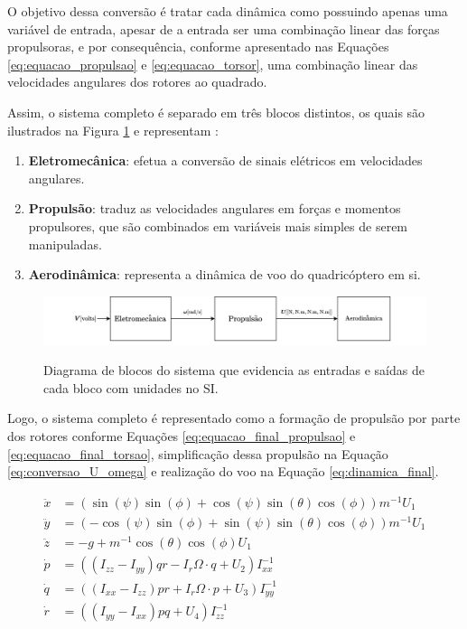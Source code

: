 \documentclass[main.tex]{subfiles}
\begin{document}
O objetivo dessa conversão é tratar cada dinâmica como possuindo apenas uma variável de entrada, apesar de a entrada ser uma combinação linear das forças propulsoras, e por consequência, conforme apresentado nas Equações \ref{eq:equacao_propulsao} e \ref{eq:equacao_torsor}, uma combinação linear das velocidades angulares dos rotores ao quadrado.


Assim, o sistema completo é separado em três blocos distintos, os quais são ilustrados na Figura \ref{fig:diagrama_blocos_final} e representam :
\begin{enumerate}
	\item \textbf{Eletromecânica}: efetua a conversão de sinais elétricos em velocidades angulares.
	\item \textbf{Propulsão}: traduz as velocidades angulares em forças e momentos propulsores, que são combinados em variáveis mais simples de serem manipuladas.
	\item \textbf{Aerodinâmica}: representa a dinâmica de voo do quadricóptero em si.
\end{enumerate} 

\begin{figure}[!h]
	\centering
	\caption{Diagrama de blocos do sistema que evidencia as entradas e saídas de cada bloco com unidades no SI.}
	\includegraphics[width=1\textwidth]{capitulos/modelagem/imgs/diagrama_blocos_final.png}
	\label{fig:diagrama_blocos_final}
\end{figure}


Logo, o sistema completo é representado como a formação de propulsão por parte dos rotores conforme Equações \ref{eq:equacao_final_propulsao} e \ref{eq:equacao_final_torsao}, simplificação dessa propulsão na Equação \ref{eq:conversao_U_omega} e realização do voo na Equação \ref{eq:dinamica_final}.

\begin{equation}\label{eq:dinamica_final}
	\begin{split}
		\ddot{x} &= (\sin{(\psi)}\sin{(\phi)} + \cos{(\psi)}\sin{(\theta)}\cos{(\phi)})m^{-1}U_1\\
		\ddot{y} &= (-\cos{(\psi)}\sin{(\phi)} + \sin{(\psi)}\sin{(\theta)}\cos{(\phi)})m^{-1}U_1\\
		\ddot{z} &= -g + m^{-1}\cos{(\theta)}\cos{(\phi)}U_1\\
		\dot{p} &= \left((I_{zz} - I_{yy})qr - I_r\Omega\cdot q + U_2\right)I_{xx}^{-1}\\
		\dot{q} &= \left((I_{xx} - I_{zz})pr + I_r\Omega\cdot p + U_3\right)I_{yy}^{-1}\\
		\dot{r} &= \left((I_{yy} - I_{xx})pq + U_4\right)I_{zz}^{-1}\\
	\end{split}
\end{equation}
\end{document}
